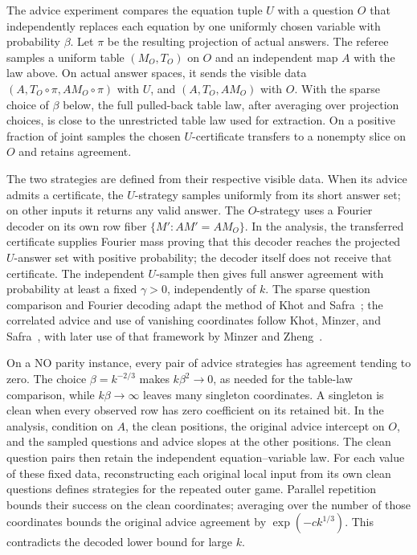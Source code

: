 The advice experiment compares the equation tuple \(U\) with a question
\(O\) that independently replaces each equation by one uniformly chosen
variable with probability \(\beta\). Let \(\pi\) be the resulting
projection of actual answers. The referee samples a uniform table
\((M_O,T_O)\) on \(O\) and an independent map \(A\) with the law above.
On actual answer spaces,
it sends the visible data \((A,T_O\circ\pi,AM_O\circ\pi)\) with \(U\),
and \((A,T_O,AM_O)\) with \(O\). With the sparse choice of \(\beta\)
below, the full pulled-back table law, after averaging over projection
choices, is close to the unrestricted table law used for extraction.
On a positive fraction of joint samples the chosen \(U\)-certificate
transfers to a nonempty slice on \(O\) and retains agreement.

The two strategies are defined from their respective visible data. When its
advice admits a certificate, the \(U\)-strategy samples uniformly from its
short answer set; on other inputs it returns any valid answer. The \(O\)-strategy uses
a Fourier decoder on its own row fiber \(\{M':AM'=AM_O\}\). In the analysis,
the transferred certificate supplies
Fourier mass proving that this decoder reaches the projected \(U\)-answer
set with positive probability; the decoder itself does not receive that
certificate. The independent \(U\)-sample then gives full answer agreement
with probability at least a fixed \(\gamma>0\), independently of \(k\).
The sparse question comparison and Fourier decoding adapt the method of
Khot and Safra~\cite{KS13}; the correlated advice and use of vanishing
coordinates follow Khot, Minzer, and Safra~\cite[Sections~3.3--3.4]{KMS17},
with later use of that framework by Minzer and Zheng~\cite[Section~3]{MZ26}.

On a NO parity instance, every pair of advice strategies has agreement
tending to zero. The choice \(\beta=k^{-2/3}\) makes \(k\beta^2\to0\),
as needed for the table-law comparison, while \(k\beta\to\infty\) leaves
many singleton coordinates. A singleton is clean when every observed
row has zero coefficient on its retained bit. In the analysis, condition
on \(A\), the clean positions, the original advice intercept on \(O\),
and the sampled questions and advice slopes at the other positions. The
clean question pairs then retain the independent equation--variable law.
For each value of these fixed data, reconstructing each original local input
from its own clean questions defines strategies for the repeated outer game.
Parallel repetition bounds their success on the clean coordinates;
averaging over the number of those coordinates bounds the original advice
agreement by \(\exp(-c k^{1/3})\). This contradicts the decoded lower bound
for large \(k\).

